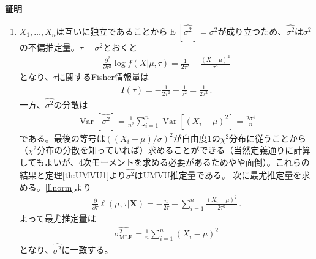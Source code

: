 \documentclass[11pt]{ltjsarticle}
\makeatletter
\theoremstyle{definition}
\DeclareMathOperator{\E}{E}
\DeclareMathOperator{\Var}{Var}
\renewenvironment{proof}[1][証明]{\par
  \pushQED{\qed}%
  \normalfont \topsep6\p@\@plus6\p@\relax
  \trivlist
  \item\relax
  {\bfseries
  #1\@addpunct{.}}\hspace\labelsep\ignorespaces
}{%
  \popQED\endtrivlist\@endpefalse
}
\makeatother
\begin{document}
\begin{proof}
\begin{enumerate}[(1)]
        \item $X_1,\ldots,X_n$は互いに独立であることから$\E[\widehat{\sigma^2}]=\sigma^2$が成り立つため、$\widehat{\sigma^2}$は$\sigma^2$の不偏推定量。$\tau=\sigma^2$とおくと
        \begin{align}
            \frac{\partial^2}{\partial \tau^2}\log f(X|\mu, \tau)=\frac{1}{2\tau^2}-\frac{(X-\mu)^2}{\tau^3}
        \end{align}
        となり、$\tau$に関するFisher情報量は
        \begin{align}
            I(\tau) = -\frac{1}{2\tau^2} + \frac{1}{\tau^2} = \frac{1}{2\tau^2}\,.
        \end{align}
        一方、$\widehat{\sigma^2}$の分散は
        \begin{align}
            \Var[\widehat{\sigma^2}] = \frac{1}{n^2}\sum_{i=1}^n \Var[(X_i-\mu)^2]=\frac{2\sigma^4}{n}
        \end{align}
        である。最後の等号は$\left((X_i-\mu)/\sigma\right)^2$が自由度1の$\chi^2$分布に従うことから（$\chi^2$分布の分散を知っていれば）求めることができる（当然定義通りに計算してもよいが、4次モーメントを求める必要があるためやや面倒）。これらの結果と定理\ref{th:UMVU1}より$\widehat{\sigma^2}$はUMVU推定量である。
        次に最尤推定量を求める。\eqref{llnorm}より
        \begin{align}
            \frac{\partial}{\partial \tau}\ell(\mu, \tau|\bm{X}) = -\frac{n}{2\tau}+\sum_{i=1}^n\frac{(X_i-\mu)^2}{2\tau^2}\,.
        \end{align}
        よって最尤推定量は
        \begin{align}\label{sigmaMLEnorm}
            \widehat{\sigma^2_{\text{MLE}}} = \frac{1}{n}\sum_{i=1}^n(X_i-\mu)^2
        \end{align}
        となり、$\widehat{\sigma^2}$に一致する。


\end{enumerate}
\end{proof}
\end{document}
